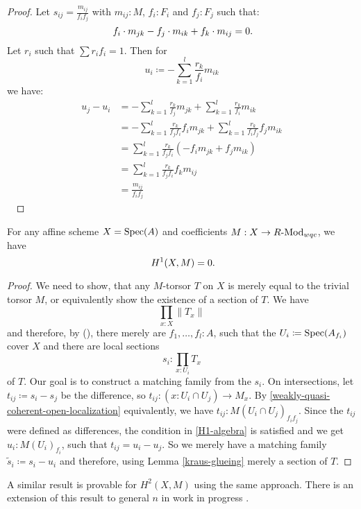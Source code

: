 \begin{proof}
  Let $s_{ij}=\frac{m_{ij}}{f_i f_j}$ with $m_{ij}:M$, $f_i:F_i$ and $f_j:F_j$ such that:
  \[ f_i\cdot m_{jk}-f_j\cdot m_{ik}+f_k\cdot m_{ij}=0 \rlap{.}\]
  Let $r_i$ such that $\sum r_i f_i =1$.
  Then for
  \[ u_i \coloneqq -\sum_{k=1}^l\frac{r_k}{f_i}m_{ik} \]
  we have:
  \begin{align*}
      u_j-u_i &= -\sum_{k=1}^l\frac{r_k}{f_j}m_{jk} + \sum_{k=1}^l\frac{r_k}{f_i}m_{ik} \\
              &= -\sum_{k=1}^l\frac{r_k}{f_j f_i}f_i m_{jk} + \sum_{k=1}^l\frac{r_k}{f_i f_j} f_j m_{ik} \\
              &= \sum_{k=1}^l\frac{r_k}{f_j f_i}(-f_i m_{jk} + f_j m_{ik}) \\
              &= \sum_{k=1}^l\frac{r_k}{f_j f_i}f_k m_{ij} \\
              &= \frac{m_{ij}}{f_i f_j}
  \end{align*}
  \ %
\end{proof}

\begin{theorem}%
  \label{H1-wqc-module-affine-trivial}
  For any affine scheme $X=\operatorname{Spec}(A)$ and coefficients $M: X\to R\text{-}\mathrm{Mod}_{wqc}$, we have
  \[ H^1(X,M)=0 \rlap{.} \]
\end{theorem}

\begin{proof}
  We need to show, that any $M$-torsor $T$ on $X$ is merely equal to the trivial torsor $M$,
  or equivalently show the existence of a section of $T$.
  We have
  \[ \prod_{x:X}\| T_x \|\]
  and therefore, by (),
  there merely are $f_1,\dots,f_l:A$,
  such that the $U_i\coloneqq \operatorname{Spec}(A_{f_i})$ cover $X$ and
  there are local sections
  \[ s_i:\prod_{x:U_i}T_x\]
  of $T$. Our goal is to construct a matching family from the $s_i$.
  On intersections, let $t_{ij}\coloneqq s_i-s_j$ be the difference, so $t_{ij}:(x : U_i\cap U_j) \to M_x$.
  By \cref{weakly-quasi-coherent-open-localization} equivalently,
  we have $t_{ij}:M(U_{i}\cap U_j)_{f_i f_j}$.
  Since the $t_{ij}$ were defined as differences,
  the condition in \cref{H1-algebra} is satisfied and we get
  $u_i:M(U_i)_{f_i}$, such that $t_{ij}=u_i-u_j$.
  So we merely have a matching family $\tilde{s}_i\coloneqq s_i-u_i$ and therefore, using Lemma \ref{kraus-glueing} merely a section of $T$.
\end{proof}

A similar result is provable for $H^2(X,M)$ using the same approach.
There is an extension of this result to general $n$ in work in progress \cite{chech-draft}.

